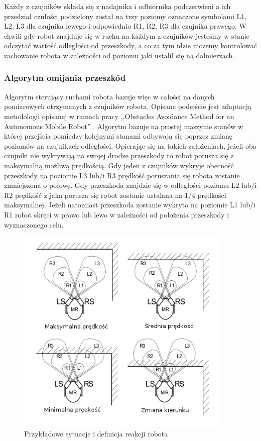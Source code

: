 Każdy z czujników składa się z nadajnika i odbiornika podczerwieni a ich
przedział czułości podzielony został na trzy poziomy oznaczone symbolami L1, L2,
L3 dla czujnika lewego i odpowiednio R1, R2, R3 dla czujnika prawego. W chwili
gdy robot znajduje się w ruchu na każdym z czujników jesteśmy w stanie odczytać
wartość odległości od przeszkody, a co za tym idzie możemy kontrolować zachowanie
robota w zależności od poziomu jaki ustalił się na dalmierzach.

\subsubsection{Algorytm omijania przeszkód}
Algorytm sterujący ruchami robota bazuje więc w całości na danych pomiarowych
otrzymanych z czujników robota. Opisane podejście jest adaptacją metodologii
opisanej w ramach pracy ,,Obstacles Avoidance Method for an Autonomous Mobile
Robot'' \cite{ObstaclesAvoidanceIR}. Algorytm bazuje na prostej maszynie stanów
w której przejścia pomiędzy kolejnymi stanami odbywają się poprzez zmianę poziomów na
czujnikach odległości. Opierając się na takich założeniach, jeżeli oba czujniki
nie wykrywają na swojej drodze przeszkody to robot porusza się z maksymalną
możliwą prędkością. Gdy jeden z czujników wykryje obecność przeszkody na poziomie
 L3 lub/i R3 prędkość poruszania się robota zostanie zmniejszona o połowę. Gdy
 przeszkoda znajdzie się w odległości poziomu L2 lub/i R2 prędkość z
jaką porusza się robot zostanie ustalana na 1/4 prędkości maksymalnej. Jeżeli
natomiast przeszkoda zostanie wykryta na poziomie L1 lub/i R1 robot skręci w
prawo lub lewo w zależności od położenia przeszkody i wyznaczonego celu.

\begin{figure}[hb]
 \centering
 \includegraphics[height=100mm]{../images/ch04/obs_avoid_algorithm.png}
 \caption{Przykładowe sytuacje i definicja reakcji robota}
 \label{fig:IRSensorPosition}
\end{figure}

